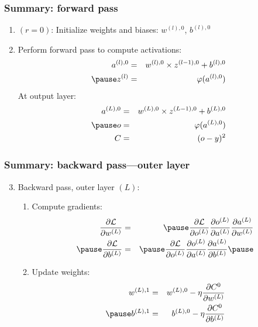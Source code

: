 \documentclass[smaller]{beamer}
\begin{document}
\begin{frame}
  \frametitle{Summary: forward pass}
  \begin{enumerate}[<+->]
  \item $(r=0)$: Initialize weights and biases: $w^{(l),0}$, $b^{(l),0}$
  \item Perform forward pass to compute activations:
    \begin{eqnarray}
      a^{(l),0} &=& w^{(l),0} \times z^{(l-1),0} + b^{(l),0} \\\pause
    z^{(l)} &=& \varphi(a^{(l),0}) 
    \end{eqnarray}
    \pause
    At output layer:
    \begin{eqnarray}      
      a^{(L),0} &=& w^{(L),0} \times z^{(L-1),0} + b^{(L),0} \\\pause
      o &=& \varphi(a^{(L),0}) \\
      C &=& (o  - y)^2
    \end{eqnarray}
  \end{enumerate}
\end{frame}

\begin{frame}
  \frametitle{Summary: backward pass---outer layer }
  \begin{enumerate}[<+->]\setcounter{enumi}{2}
  \item Backward pass, outer layer $(L)$:\pause
    \begin{enumerate}[<+->]
    \item Compute gradients: \pause
      \begin{eqnarray}
      \pd{\mc{L}}{w^{(L)}} &=& \pause \pd{\mc{L}}{o^{(L)}}\pd{o^{(L)}}{a^{(L)}}\pd{a^{(L)}}{w^{(L)}}\\\pause
      \pd{\mc{L}}{b^{(L)}} &=& \pause \pd{\mc{L}}{o^{(L)}}\pd{o^{(L)}}{a^{(L)}}\pd{a^{(L)}}{b^{(L)}}\pause
      \end{eqnarray}
    \item Update weights: \pause
      \begin{eqnarray}
        w^{(L), 1}  &=&  w^{(L),0} - \eta \pd{C^0}{w^{(L)}}  \\\pause
      b^{(L), 1}  &=&  b^{(L),0} - \eta \pd{C^0}{b^{(L)}}  
      \end{eqnarray}
  \end{enumerate}
  \end{enumerate}
\end{frame}
\end{document}
